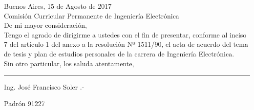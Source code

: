\hfill Buenos Aires, 15 de Agosto de 2017
\\

\noindent Comisión Curricular Permanente de Ingeniería Electrónica
\\

\noindent De mi mayor consideración,
\\

Tengo el agrado de dirigirme a ustedes con el fin de presentar, conforme al inciso 7 del artículo 1 del anexo a la resolución Nº 1511/90, el acta de acuerdo del tema de tesis y plan de estudios personales de la carrera de Ingeniería Electrónica.
\\

Sin otro particular, los saluda atentamente,

\vspace*{3cm}
\noindent\rule{5cm}{0.4pt}

\noindent Ing. José Francisco Soler .-

\noindent Padrón 91227
